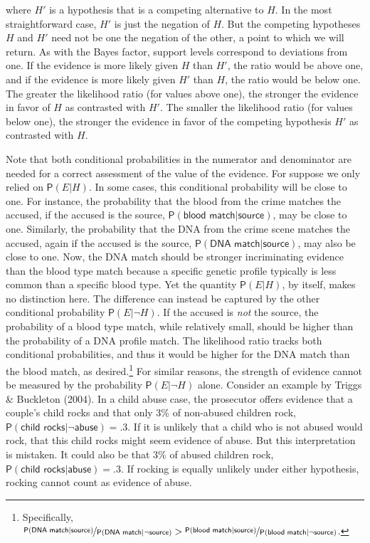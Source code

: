 \documentclass[
  letterpaper,
  DIV=11,
  numbers=noendperiod]{scrartcl}
\newcommand{\pr}[1]{\mathsf{P}(#1)}
\begin{document}
\noindent where \(H'\) is a hypothesis that is a competing alternative
to \(H\). In the most straightforward case, \(H'\) is just the negation
of \(H\). But the competing hypotheses \(H\) and \(H'\) need not be one
the negation of the other, a point to which we will return. As with the
Bayes factor, support levels correspond to deviations from one. If the
evidence is more likely given \(H\) than \(H'\), the ratio would be
above one, and if the evidence is more likely given \(H'\) than \(H\),
the ratio would be below one. The greater the likelihood ratio (for
values above one), the stronger the evidence in favor of \(H\) as
contrasted with \(H'\). The smaller the likelihood ratio (for values
below one), the stronger the evidence in favor of the competing
hypothesis \(H'\) as contrasted with \(H\).

Note that both conditional probabilities in the numerator and
denominator are needed for a correct assessment of the value of the
evidence. For suppose we only relied on \(\pr{E \vert H}\). In some
cases, this conditional probability will be close to one. For instance,
the probability that the blood from the crime matches the accused, if
the accused is the source,
\(\pr{\textsf{blood match} \vert \textsf{source}}\), may be close to
one. Similarly, the probability that the DNA from the crime scene
matches the accused, again if the accused is the source,
\(\pr{\textsf{DNA match} \vert \textsf{source}}\), may also be close to
one. Now, the DNA match should be stronger incriminating evidence than
the blood type match because a specific genetic profile typically is
less common than a specific blood type. Yet the quantity
\(\pr{E \vert H}\), by itself, makes no distinction here. The difference
can instead be captured by the other conditional probability
\(\pr{E \vert \neg H}\). If the accused is \textit{not} the source, the
probability of a blood type match, while relatively small, should be
higher than the probability of a DNA profile match. The likelihood ratio
tracks both conditional probabilities, and thus it would be higher for
the DNA match than the blood match, as desired.\footnote{Specifically,
  \(\nicefrac{\pr{\textsf{DNA match} \vert \textsf{source}}}{\pr{\textsf{DNA match} \vert \neg \textsf{source}}} > \nicefrac{\pr{\textsf{blood match} \vert \textsf{source}}}{\pr{\textsf{blood match} \vert \neg \textsf{source}}}\).}
For similar reasons, the strength of evidence cannot be measured by the
probability \(\pr{E \vert \neg H}\) alone. Consider an example by Triggs
\& Buckleton (2004). In a child abuse case, the prosecutor offers
\label{text:rock} evidence that a couple's child rocks and that only 3\%
of non-abused children rock,
\(\pr{\textsf{child rocks} \vert \neg \textsf{abuse}}=.3\). If it is
unlikely that a child who is not abused would rock, that this child
rocks might seem evidence of abuse. But this interpretation is mistaken.
It could also be that 3\% of abused children rock,
\(\pr{\textsf{child rocks} \vert \textsf{abuse}}=.3\). If rocking is
equally unlikely under either hypothesis, rocking cannot count as
evidence of abuse.
\end{document}
